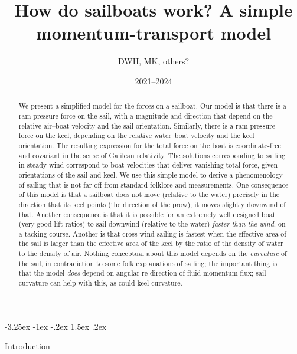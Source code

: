 \documentclass[letterpaper]{article}
\title{\bfseries%
How do sailboats work? A simple momentum-transport model}
\author{DWH, MK, others?}
\date{2021--2024}
\makeatletter
\renewcommand\section{\@startsection {section}{1}{\z@}%
  {-3.25ex \@plus -1ex \@minus -.2ex}%
  {1.5ex \@plus .2ex}%
  {\raggedright\normalfont\large\bfseries}}
\makeatother
\begin{document}
\maketitle

\begin{abstract}\noindent
    We present a simplified model for the forces on a sailboat.
    Our model is that there is a ram-pressure force on the sail, with a magnitude and direction that depend on the relative air--boat velocity and the sail orientation.
    Similarly, there is a ram-pressure force on the keel, depending on the relative water--boat velocity and the keel orientation.
    The resulting expression for the total force on the boat is coordinate-free and covariant in the sense of Galilean relativity.
    The solutions corresponding to sailing in steady wind correspond to boat velocities that deliver vanishing total force, given orientations of the sail and keel.
    We use this simple model to derive a phenomenology of sailing that is not far off from standard folklore and measurements.
    One consequence of this model is that a sailboat does not move (relative to the water) precisely in the direction that its keel points (the direction of the prow); it moves slightly downwind of that.
    Another consequence is that it is possible for an extremely well designed boat (very good lift ratios) to sail downwind (relative to the water) \emph{faster than the wind}, on a tacking course.
    Another is that cross-wind sailing is fastest when the effective area of the sail is larger than the effective area of the keel by the ratio of the density of water to the density of air.
    Nothing conceptual about this model depends on the \emph{curvature} of the sail, in contradiction to some folk explanations of sailing; the important thing is that the model \emph{does} depend on angular re-direction of fluid momentum flux; sail curvature can help with this, as could keel curvature.
\end{abstract}

\section{Introduction}\label{sec:intro}
\end{document}
